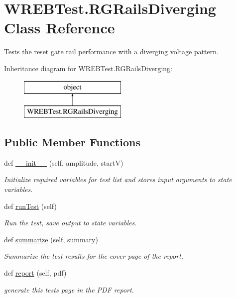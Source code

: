 \hypertarget{class_w_r_e_b_test_1_1_r_g_rails_diverging}{}\section{W\+R\+E\+B\+Test.\+R\+G\+Rails\+Diverging Class Reference}
\label{class_w_r_e_b_test_1_1_r_g_rails_diverging}


Tests the reset gate rail performance with a diverging voltage pattern.  


Inheritance diagram for W\+R\+E\+B\+Test.\+R\+G\+Rails\+Diverging\+:\begin{figure}[H]
\begin{center}
\leavevmode
\includegraphics[height=2.000000cm]{class_w_r_e_b_test_1_1_r_g_rails_diverging}
\end{center}
\end{figure}
\subsection*{Public Member Functions}
\begin{DoxyCompactItemize}
\item 
def \hyperlink{class_w_r_e_b_test_1_1_r_g_rails_diverging_a7fab6121125ab257cc56bc703393fe08}{\+\_\+\+\_\+init\+\_\+\+\_\+} (self, amplitude, startV)
\begin{DoxyCompactList}\small\item\em Initialize required variables for test list and stores input arguments to state variables. \end{DoxyCompactList}\item 
def \hyperlink{class_w_r_e_b_test_1_1_r_g_rails_diverging_ac8d72cae4d14bb10d651b74ccfde9aa6}{run\+Test} (self)
\begin{DoxyCompactList}\small\item\em Run the test, save output to state variables. \end{DoxyCompactList}\item 
def \hyperlink{class_w_r_e_b_test_1_1_r_g_rails_diverging_a59dd2895cefaef9903db2fdc158880e9}{summarize} (self, summary)
\begin{DoxyCompactList}\small\item\em Summarize the test results for the cover page of the report. \end{DoxyCompactList}\item 
def \hyperlink{class_w_r_e_b_test_1_1_r_g_rails_diverging_a1142b123cc5c8ef1cbea181c932df3bf}{report} (self, pdf)
\begin{DoxyCompactList}\small\item\em generate this test\textquotesingle{}s page in the P\+DF report. \end{DoxyCompactList}\end{DoxyCompactItemize}


